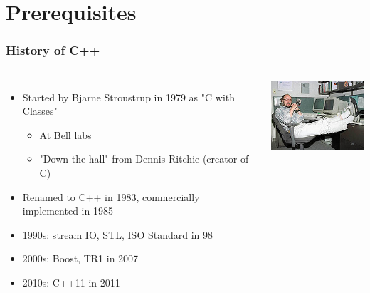\documentclass{beamer}
\begin{document}

\section{Prerequisites}

\begin{frame}
    \frametitle{History of C++}



    \begin{columns}[t]
        \column{7cm}
        \begin{itemize}
            \item<1->Started by Bjarne Stroustrup in 1979 as "C with Classes"
                \begin{itemize}
                    \item At Bell labs
                    \item "Down the hall" from Dennis Ritchie (creator of C)
                \end{itemize}
            \item<1->Renamed to C++ in 1983, commercially implemented in 1985
            \item<2->1990s: stream IO, STL, ISO Standard in 98
            \item<3->2000s: Boost, TR1 in 2007
            \item<4->2010s: C++11 in 2011
        \end{itemize}
        \column[T]{4cm}
        \includegraphics[width=4cm]{220px-BjarneStroustrup.jpg}
    \end{columns}


\end{frame}
\end{document}
